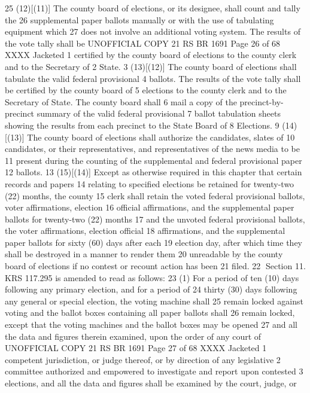 25 (12)[(11)] The county board of elections, or its designee, shall count and tally the
26 supplemental paper ballots manually or with the use of tabulating equipment which
27 does not involve an additional voting system. The results of the vote tally shall be 
UNOFFICIAL COPY 21 RS BR 1691
Page 26 of 68
XXXX Jacketed
1 certified by the county board of elections to the county clerk and to the Secretary of
2 State.
3 (13)[(12)] The county board of elections shall tabulate the valid federal provisional
4 ballots. The results of the vote tally shall be certified by the county board of
5 elections to the county clerk and to the Secretary of State. The county board shall
6 mail a copy of the precinct-by-precinct summary of the valid federal provisional
7 ballot tabulation sheets showing the results from each precinct to the State Board of
8 Elections.
9 (14)[(13)] The county board of elections shall authorize the candidates, slates of
10 candidates, or their representatives, and representatives of the news media to be
11 present during the counting of the supplemental and federal provisional paper
12 ballots.
13 (15)[(14)] Except as otherwise required in this chapter that certain records and papers
14 relating to specified elections be retained for twenty-two (22) months, the county
15 clerk shall retain the voted federal provisional ballots, voter affirmations, election
16 official affirmations, and the supplemental paper ballots for twenty-two (22) months
17 and the unvoted federal provisional ballots, the voter affirmations, election official
18 affirmations, and the supplemental paper ballots for sixty (60) days after each
19 election day, after which time they shall be destroyed in a manner to render them
20 unreadable by the county board of elections if no contest or recount action has been
21 filed.
22 Section 11. KRS 117.295 is amended to read as follows:
23 (1) For a period of ten (10) days following any primary election, and for a period of
24 thirty (30) days following any general or special election, the voting machine shall
25 remain locked against voting and the ballot boxes containing all paper ballots shall
26 remain locked, except that the voting machines and the ballot boxes may be opened
27 and all the data and figures therein examined, upon the order of any court of 
UNOFFICIAL COPY 21 RS BR 1691
Page 27 of 68
XXXX Jacketed
1 competent jurisdiction, or judge thereof, or by direction of any legislative
2 committee authorized and empowered to investigate and report upon contested
3 elections, and all the data and figures shall be examined by the court, judge, or
